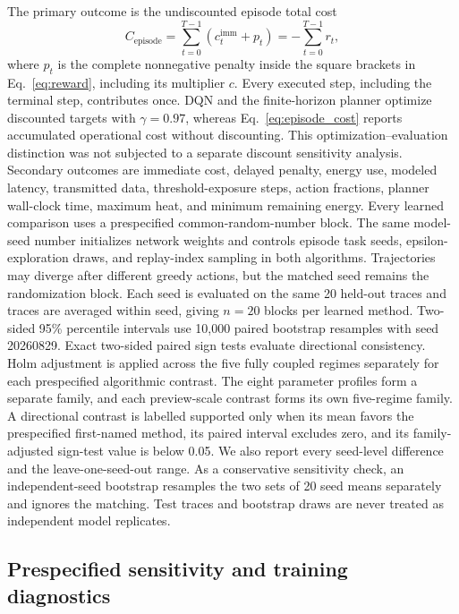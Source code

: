 \documentclass[11pt]{article}
\begin{document}
\color{red}%
The primary outcome is the undiscounted episode total cost
\begin{equation}
C_{\mathrm{episode}}=\sum_{t=0}^{T-1}\left(c^{\mathrm{imm}}_t+p_t\right)=-\sum_{t=0}^{T-1}r_t,
\label{eq:episode_cost}
\end{equation}
where $p_t$ is the complete nonnegative penalty inside the square brackets in Eq.~\eqref{eq:reward}, including its multiplier $c$. Every executed step, including the terminal step, contributes once. DQN and the finite-horizon planner optimize discounted targets with $\gamma=0.97$, whereas Eq.~\eqref{eq:episode_cost} reports accumulated operational cost without discounting. This optimization--evaluation distinction was not subjected to a separate discount sensitivity analysis. Secondary outcomes are immediate cost, delayed penalty, energy use, modeled latency, transmitted data, threshold-exposure steps, action fractions, planner wall-clock time, maximum heat, and minimum remaining energy. Every learned comparison uses a prespecified common-random-number block. The same model-seed number initializes network weights and controls episode task seeds, epsilon-exploration draws, and replay-index sampling in both algorithms. Trajectories may diverge after different greedy actions, but the matched seed remains the randomization block. Each seed is evaluated on the same 20 held-out traces and traces are averaged within seed, giving $n=20$ blocks per learned method. Two-sided 95\% percentile intervals use 10,000 paired bootstrap resamples with seed 20260829. Exact two-sided paired sign tests evaluate directional consistency. Holm adjustment is applied across the five fully coupled regimes separately for each prespecified algorithmic contrast. The eight parameter profiles form a separate family, and each preview-scale contrast forms its own five-regime family. A directional contrast is labelled supported only when its mean favors the prespecified first-named method, its paired interval excludes zero, and its family-adjusted sign-test value is below 0.05. We also report every seed-level difference and the leave-one-seed-out range. As a conservative sensitivity check, an independent-seed bootstrap resamples the two sets of 20 seed means separately and ignores the matching. Test traces and bootstrap draws are never treated as independent model replicates.
\color{black}%

\subsection{Prespecified sensitivity and training diagnostics}
\end{document}
